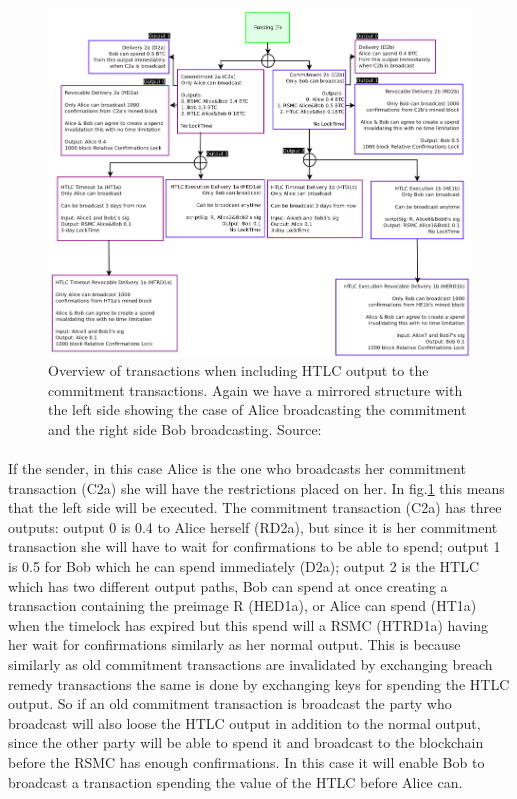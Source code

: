 \documentclass[informationsecurity]{gucmasterproject}
\begin{document}
\begin{figure}[h]
    \centering
    \includegraphics[width=14cm]{figs/ln_htlc.png}
    \caption{ Overview of transactions when including HTLC output to the commitment transactions. Again we have a mirrored structure with the left side showing the case of Alice broadcasting the commitment and the right side Bob broadcasting.  Source: \cite{poon2015bitcoin}}
    \label{fig:htlc_commit}
\end{figure}


\paragraph{}
If the sender, in this case Alice is the one who broadcasts her commitment transaction (C2a) she will have the restrictions placed on her.
In fig.\ref{fig:htlc_commit} this means that the left side will be executed. The commitment transaction (C2a) has three outputs: output 0 is 0.4 to Alice herself (RD2a), but since it is her commitment transaction she will have to wait for confirmations to be able to spend; output 1 is 0.5 for Bob which he can spend immediately (D2a); output 2 is the HTLC which has two different output paths, Bob can spend at once creating a transaction containing the preimage R (HED1a), or Alice can spend (HT1a) when the timelock has expired but this spend will a RSMC (HTRD1a) having her wait for confirmations similarly as her normal output. This is because similarly as old commitment transactions are invalidated by exchanging breach remedy transactions the same is done by exchanging keys for spending the HTLC output. So if an old commitment transaction is broadcast the party who broadcast will also loose the HTLC output in addition to the normal output, since the other party will be able to spend it and broadcast to the blockchain before the RSMC has enough confirmations. In this case it will enable Bob to broadcast a transaction spending the value of the HTLC before Alice can.
\end{document}
